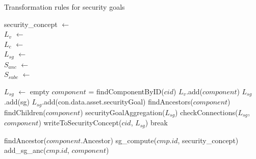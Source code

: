 \begin{algorithm}[H]
\caption{Transformation rules for security goals}
security\_concept $\gets$  \\
$L_v$ $\gets$  \\
$L_c$ $\gets$  \\
$L_{sg}$ $\gets$  \\
$S_{anc}$ $\gets$  \\
$S_{subc}$ $\gets$  \\

\begin{algorithmic}[1]

\State $L_{sg}$ $\gets$ empty
\State $component$ = findComponentByID($cid$)
\State $L_v$.add($component$)
 \label{line:iterate_own_sg}
	\State $L_{sg}$.add(sg)	
\EndFor
{}
\State $L_{sg}$.add(con.data.asset.securityGoal)
\EndFor
\State findAncestors($component$) 
\State findChildren($component$) 
\State securityGoalAggregation({$L_{sg}$})
\State checkConnections($L_{sg}$, $component$)
\State writeToSecurityConcept($cid$, $L_{sg}$) 
\Else
\State break
\EndIf
\EndFunction

\EndIf
\State findAncestor($component$.Ancestor)
\Else
{}
\State sg\_compute($cmp.id$, security\_concept) \label{line:ancestor}
\State add\_sg\_anc($cmp.id$, $component$)
\EndFor
\EndIf

\EndFunction
{} 

\end{algorithmic}
\end{algorithm}

